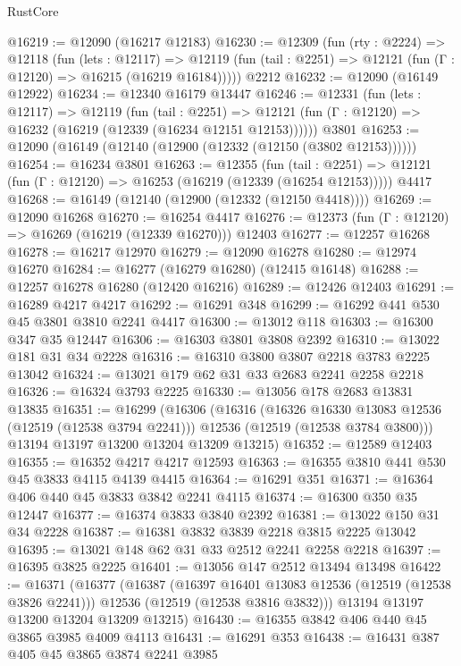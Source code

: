 \begin{lexlean}{RustCore}
\begin{coremodule}
@16219 := @12090 (@16217 @12183)
@16230 := @12309
    (fun (rty : @2224) =>
    @12118
      (fun (lets : @12117) =>
      @12119 (fun (tail : @2251) => @12121 (fun (Γ : @12120) => @16215 (@16219 @16184)))))
    @2212
@16232 := @12090 (@16149 @12922)
@16234 := @12340 @16179 @13447
@16246 := @12331
    (fun (lets : @12117) =>
    @12119
      (fun (tail : @2251) =>
      @12121 (fun (Γ : @12120) => @16232 (@16219 (@12339 (@16234 @12151 @12153))))))
    @3801
@16253 := @12090 (@16149 (@12140 (@12900 (@12332 (@12150 (@3802 @12153))))))
@16254 := @16234 @3801
@16263 := @12355
    (fun (tail : @2251) => @12121 (fun (Γ : @12120) => @16253 (@16219 (@12339 (@16254 @12153)))))
    @4417
@16268 := @16149 (@12140 (@12900 (@12332 (@12150 @4418))))
@16269 := @12090 @16268
@16270 := @16254 @4417
@16276 := @12373 (fun (Γ : @12120) => @16269 (@16219 (@12339 @16270))) @12403
@16277 := @12257 @16268
@16278 := @16217 @12970
@16279 := @12090 @16278
@16280 := @12974 @16270
@16284 := @16277 (@16279 @16280) (@12415 @16148)
@16288 := @12257 @16278 @16280 (@12420 @16216)
@16289 := @12426 @12403
@16291 := @16289 @4217 @4217
@16292 := @16291 @348
@16299 := @16292 @441 @530 @45 @3801 @3810 @2241 @4417
@16300 := @13012 @118
@16303 := @16300 @347 @35 @12447
@16306 := @16303 @3801 @3808 @2392
@16310 := @13022 @181 @31 @34 @2228
@16316 := @16310 @3800 @3807 @2218 @3783 @2225 @13042
@16324 := @13021 @179 @62 @31 @33 @2683 @2241 @2258 @2218
@16326 := @16324 @3793 @2225
@16330 := @13056 @178 @2683 @13831 @13835
@16351 := @16299
    (@16306
      (@16316
        (@16326 @16330 @13083 @12536 (@12519 (@12538 @3794 @2241)))
        @12536
        (@12519 (@12538 @3784 @3800)))
      @13194
      @13197
      @13200
      @13204
      @13209
      @13215)
@16352 := @12589 @12403
@16355 := @16352 @4217 @4217 @12593
@16363 := @16355 @3810 @441 @530 @45 @3833 @4115 @4139 @4415
@16364 := @16291 @351
@16371 := @16364 @406 @440 @45 @3833 @3842 @2241 @4115
@16374 := @16300 @350 @35 @12447
@16377 := @16374 @3833 @3840 @2392
@16381 := @13022 @150 @31 @34 @2228
@16387 := @16381 @3832 @3839 @2218 @3815 @2225 @13042
@16395 := @13021 @148 @62 @31 @33 @2512 @2241 @2258 @2218
@16397 := @16395 @3825 @2225
@16401 := @13056 @147 @2512 @13494 @13498
@16422 := @16371
    (@16377
      (@16387
        (@16397 @16401 @13083 @12536 (@12519 (@12538 @3826 @2241)))
        @12536
        (@12519 (@12538 @3816 @3832)))
      @13194
      @13197
      @13200
      @13204
      @13209
      @13215)
@16430 := @16355 @3842 @406 @440 @45 @3865 @3985 @4009 @4113
@16431 := @16291 @353
@16438 := @16431 @387 @405 @45 @3865 @3874 @2241 @3985

\end{coremodule}
\end{lexlean}

